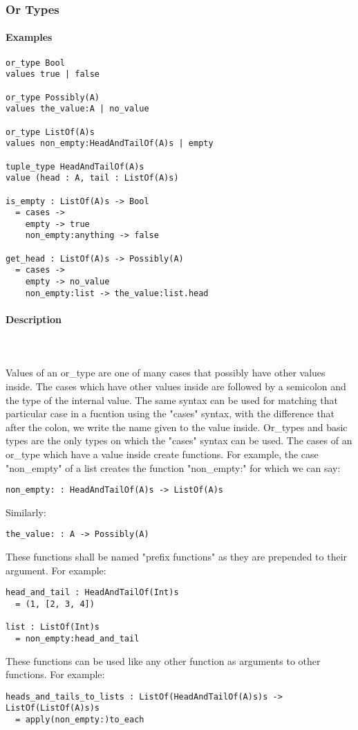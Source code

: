 \documentclass{article}
\def\pend{\mbox{} \\\\}
\begin{document}
\subsubsection{Or Types}

\paragraph{Examples}

\begin{verbatim}
or_type Bool
values true | false

or_type Possibly(A)
values the_value:A | no_value

or_type ListOf(A)s
values non_empty:HeadAndTailOf(A)s | empty

tuple_type HeadAndTailOf(A)s
value (head : A, tail : ListOf(A)s)

is_empty : ListOf(A)s -> Bool
  = cases -> 
    empty -> true
    non_empty:anything -> false

get_head : ListOf(A)s -> Possibly(A)
  = cases -> 
    empty -> no_value
    non_empty:list -> the_value:list.head
\end{verbatim}

\paragraph{Description}\pend
Values of an or\_type are one of many cases that possibly have other values inside.
The cases which have other values inside are followed by a semicolon and the 
type of the internal value. The same syntax can be used for matching that particular 
case in a fucntion using the "cases" syntax, with the difference that after the
colon, we write the name given to the value inside. 
Or\_types and basic types are the only types on which
the "cases" syntax can be used. The cases of an or\_type which have a value
inside create functions. For example, the case "non\_empty" of a list creates the
function "non\_empty:" for which we can say:
\begin{verbatim}
non_empty: : HeadAndTailOf(A)s -> ListOf(A)s
\end{verbatim}
Similarly:
\begin{verbatim}
the_value: : A -> Possibly(A)
\end{verbatim}
These functions shall be named "prefix functions" as they are prepended to their
argument.
For example:
\begin{verbatim}
head_and_tail : HeadAndTailOf(Int)s
  = (1, [2, 3, 4])

list : ListOf(Int)s
  = non_empty:head_and_tail
\end{verbatim}
These functions can be used like any other function as arguments to other functions.
For example:
\begin{verbatim}
heads_and_tails_to_lists : ListOf(HeadAndTailOf(A)s)s -> ListOf(ListOf(A)s)s
  = apply(non_empty:)to_each
\end{verbatim}
\end{document}
